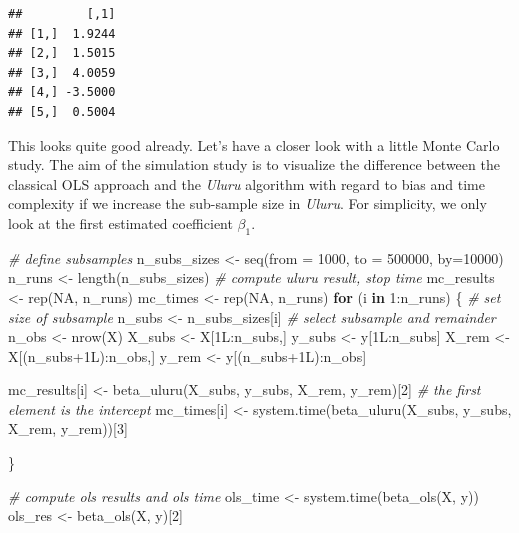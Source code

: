\documentclass[
  12pt,
]{style/krantz}
\newenvironment{Shaded}{\begin{snugshade}}{\end{snugshade}}
\newcommand{\AttributeTok}[1]{\textcolor[rgb]{0.77,0.63,0.00}{#1}}
\newcommand{\CommentTok}[1]{\textcolor[rgb]{0.56,0.35,0.01}{\textit{#1}}}
\newcommand{\ConstantTok}[1]{\textcolor[rgb]{0.00,0.00,0.00}{#1}}
\newcommand{\ControlFlowTok}[1]{\textcolor[rgb]{0.13,0.29,0.53}{\textbf{#1}}}
\newcommand{\DecValTok}[1]{\textcolor[rgb]{0.00,0.00,0.81}{#1}}
\newcommand{\FunctionTok}[1]{\textcolor[rgb]{0.00,0.00,0.00}{#1}}
\newcommand{\NormalTok}[1]{#1}
\newcommand{\OtherTok}[1]{\textcolor[rgb]{0.56,0.35,0.01}{#1}}
\newcommand{\SpecialCharTok}[1]{\textcolor[rgb]{0.00,0.00,0.00}{#1}}
\begin{document}
\begin{verbatim}
##         [,1]
## [1,]  1.9244
## [2,]  1.5015
## [3,]  4.0059
## [4,] -3.5000
## [5,]  0.5004
\end{verbatim}

This looks quite good already. Let's have a closer look with a little Monte Carlo study. The aim of the simulation study is to visualize the difference between the classical OLS approach and the \emph{Uluru} algorithm with regard to bias and time complexity if we increase the sub-sample size in \emph{Uluru}. For simplicity, we only look at the first estimated coefficient \(\beta_{1}\).

\begin{Shaded}
\begin{Highlighting}[]
\CommentTok{\# define subsamples}
\NormalTok{n\_subs\_sizes }\OtherTok{\textless{}{-}} \FunctionTok{seq}\NormalTok{(}\AttributeTok{from =} \DecValTok{1000}\NormalTok{, }\AttributeTok{to =} \DecValTok{500000}\NormalTok{, }\AttributeTok{by=}\DecValTok{10000}\NormalTok{)}
\NormalTok{n\_runs }\OtherTok{\textless{}{-}} \FunctionTok{length}\NormalTok{(n\_subs\_sizes)}
\CommentTok{\# compute uluru result, stop time}
\NormalTok{mc\_results }\OtherTok{\textless{}{-}} \FunctionTok{rep}\NormalTok{(}\ConstantTok{NA}\NormalTok{, n\_runs)}
\NormalTok{mc\_times }\OtherTok{\textless{}{-}} \FunctionTok{rep}\NormalTok{(}\ConstantTok{NA}\NormalTok{, n\_runs)}
\ControlFlowTok{for}\NormalTok{ (i }\ControlFlowTok{in} \DecValTok{1}\SpecialCharTok{:}\NormalTok{n\_runs) \{}
     \CommentTok{\# set size of subsample}
\NormalTok{     n\_subs }\OtherTok{\textless{}{-}}\NormalTok{ n\_subs\_sizes[i]}
     \CommentTok{\# select subsample and remainder}
\NormalTok{     n\_obs }\OtherTok{\textless{}{-}} \FunctionTok{nrow}\NormalTok{(X)}
\NormalTok{     X\_subs }\OtherTok{\textless{}{-}}\NormalTok{ X[1L}\SpecialCharTok{:}\NormalTok{n\_subs,]}
\NormalTok{     y\_subs }\OtherTok{\textless{}{-}}\NormalTok{ y[1L}\SpecialCharTok{:}\NormalTok{n\_subs]}
\NormalTok{     X\_rem }\OtherTok{\textless{}{-}}\NormalTok{ X[(n\_subs}\SpecialCharTok{+}\NormalTok{1L)}\SpecialCharTok{:}\NormalTok{n\_obs,]}
\NormalTok{     y\_rem }\OtherTok{\textless{}{-}}\NormalTok{ y[(n\_subs}\SpecialCharTok{+}\NormalTok{1L)}\SpecialCharTok{:}\NormalTok{n\_obs]}
     
\NormalTok{     mc\_results[i] }\OtherTok{\textless{}{-}} \FunctionTok{beta\_uluru}\NormalTok{(X\_subs, y\_subs, X\_rem, y\_rem)[}\DecValTok{2}\NormalTok{] }\CommentTok{\# the first element is the intercept}
\NormalTok{     mc\_times[i] }\OtherTok{\textless{}{-}} \FunctionTok{system.time}\NormalTok{(}\FunctionTok{beta\_uluru}\NormalTok{(X\_subs, y\_subs, X\_rem, y\_rem))[}\DecValTok{3}\NormalTok{]}
     
\NormalTok{\}}

\CommentTok{\# compute ols results and ols time}
\NormalTok{ols\_time }\OtherTok{\textless{}{-}} \FunctionTok{system.time}\NormalTok{(}\FunctionTok{beta\_ols}\NormalTok{(X, y))}
\NormalTok{ols\_res }\OtherTok{\textless{}{-}} \FunctionTok{beta\_ols}\NormalTok{(X, y)[}\DecValTok{2}\NormalTok{]}
\end{Highlighting}
\end{Shaded}
\end{document}
